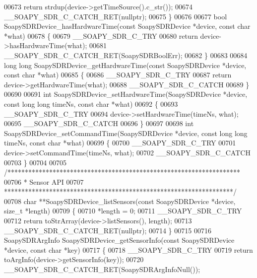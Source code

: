 \begin{DoxyCode}
00673     \textcolor{keywordflow}{return} strdup(device->getTimeSource().c\_str());
00674     __SOAPY_SDR_C_CATCH_RET(\textcolor{keyword}{nullptr});
00675 \}
00676 
00677 \textcolor{keywordtype}{bool} SoapySDRDevice_hasHardwareTime(\textcolor{keyword}{const} SoapySDRDevice *device, \textcolor{keyword}{const} \textcolor{keywordtype}{char} *what)
00678 \{
00679     __SOAPY_SDR_C_TRY
00680     \textcolor{keywordflow}{return} device->hasHardwareTime(what);
00681     __SOAPY_SDR_C_CATCH_RET(SoapySDRBoolErr);
00682 \}
00683 
00684 \textcolor{keywordtype}{long} \textcolor{keywordtype}{long} SoapySDRDevice_getHardwareTime(\textcolor{keyword}{const} SoapySDRDevice *device, \textcolor{keyword}{const} \textcolor{keywordtype}{char} *what)
00685 \{
00686     __SOAPY_SDR_C_TRY
00687     \textcolor{keywordflow}{return} device->getHardwareTime(what);
00688     __SOAPY_SDR_C_CATCH
00689 \}
00690 
00691 \textcolor{keywordtype}{int} SoapySDRDevice_setHardwareTime(SoapySDRDevice *device, \textcolor{keyword}{const} \textcolor{keywordtype}{long} \textcolor{keywordtype}{long} timeNs, \textcolor{keyword}{const} \textcolor{keywordtype}{char} *what)
00692 \{
00693     __SOAPY_SDR_C_TRY
00694     device->setHardwareTime(timeNs, what);
00695     __SOAPY_SDR_C_CATCH
00696 \}
00697 
00698 \textcolor{keywordtype}{int} SoapySDRDevice_setCommandTime(SoapySDRDevice *device, \textcolor{keyword}{const} \textcolor{keywordtype}{long} \textcolor{keywordtype}{long} timeNs, \textcolor{keyword}{const} \textcolor{keywordtype}{char} *what)
00699 \{
00700     __SOAPY_SDR_C_TRY
00701     device->setCommandTime(timeNs, what);
00702     __SOAPY_SDR_C_CATCH
00703 \}
00704 
00705 \textcolor{comment}{/*******************************************************************}
00706 \textcolor{comment}{ * Sensor API}
00707 \textcolor{comment}{ ******************************************************************/}
00708 \textcolor{keywordtype}{char} **SoapySDRDevice_listSensors(\textcolor{keyword}{const} SoapySDRDevice *device, \textcolor{keywordtype}{size\_t} *length)
00709 \{
00710     *length = 0;
00711     __SOAPY_SDR_C_TRY
00712     \textcolor{keywordflow}{return} toStrArray(device->listSensors(), length);
00713     __SOAPY_SDR_C_CATCH_RET(\textcolor{keyword}{nullptr});
00714 \}
00715 
00716 SoapySDRArgInfo SoapySDRDevice_getSensorInfo(\textcolor{keyword}{const} SoapySDRDevice *device, \textcolor{keyword}{const} \textcolor{keywordtype}{char} *key)
00717 \{
00718     __SOAPY_SDR_C_TRY
00719     \textcolor{keywordflow}{return} toArgInfo(device->getSensorInfo(key));
00720     __SOAPY_SDR_C_CATCH_RET(SoapySDRArgInfoNull());

\end{DoxyCode}
